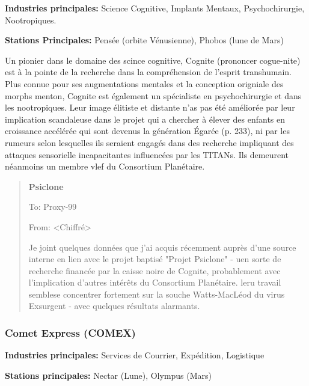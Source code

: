                \textbf{Industries principales:} Science Cognitive, Implants Mentaux, Psychochirurgie, Nootropiques. 

               \textbf{Stations Principales:} Pensée (orbite Vénusienne), Phobos (lune de Mars) 

               Un pionier dans le domaine des scince cognitive, Cognite (prononcer cogue-nite) est à la pointe de la recherche dans la compréhension de l'esprit transhumain. Plus connue pour ses augmentations mentales et la conception origniale des morphs menton, Cognite est également un spécialiste en psychochirurgie et dans les nootropiques. Leur image élitiste et distante n'as pas été améliorée par leur implication scandaleuse dans le projet qui a chercher à élever des enfants en croissance accélérée qui sont devenus la génération Égarée (p. 233), ni par les rumeurs selon lesquelles ils seraient engagés dans des recherche impliquant des attaques sensorielle incapacitantes influencées par les TITANs. Ils demeurent néanmoins un membre vlef du Consortium Planétaire. 

               \begin{quotation} \textbf{Psiclone} 

                  To: Proxy-99 

                  From: <Chiffré> 

                  Je joint quelques données que j'ai acquis récemment auprès d'une source interne en lien avec le projet baptisé "Projet Psiclone" - uen sorte de recherche financée par la caisse noire de Cognite, probablement avec l'implication d'autres intérêts du Consortium Planétaire. leru travail semblese concentrer fortement sur la souche Watts-MacLéod du virus Exsurgent - avec quelques résultats alarmants. \end{quotation} 

                  \subsubsection{Comet Express (COMEX)} \label{sec:comet-express-comex} 

                  \textbf{Industries principales:} Services de Courrier, Expédition, Logistique 

                  \textbf{Stations principales:} Nectar (Lune), Olympus (Mars) 

